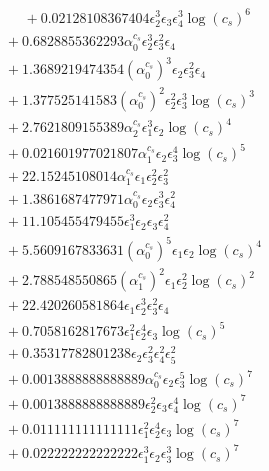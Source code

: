 \documentclass[10pt]{article}
\begin{document}
\begin{align*}
\phantom{F_{s,7}} &\phantom{={}}{}  + 0.02128108367404 \epsilon_{2}^{3} \epsilon_{3} \epsilon_{4}^{3} \log{\left(c_{s} \right)}^{6} \\
&{}  + 0.6828855362293 \alpha_{0}^{c_s} \epsilon_{2}^{3} \epsilon_{3}^{2} \epsilon_{4} \\
&{}  + 1.3689219474354 \left(\alpha_{0}^{c_s}\right)^{3} \epsilon_{2} \epsilon_{3}^{2} \epsilon_{4} \\
&{}  + 1.377525141583 \left(\alpha_{0}^{c_s}\right)^{2} \epsilon_{2}^{2} \epsilon_{3}^{3} \log{\left(c_{s} \right)}^{3} \\
&{}  + 2.7621809155389 \alpha_{2}^{c_s} \epsilon_{1}^{3} \epsilon_{2} \log{\left(c_{s} \right)}^{4} \\
&{}  + 0.021601977021807 \alpha_{1}^{c_s} \epsilon_{2} \epsilon_{3}^{4} \log{\left(c_{s} \right)}^{5} \\
&{}  + 22.15245108014 \alpha_{1}^{c_s} \epsilon_{1} \epsilon_{2}^{2} \epsilon_{3}^{2} \\
&{}  + 1.3861687477971 \alpha_{0}^{c_s} \epsilon_{2} \epsilon_{3}^{3} \epsilon_{4}^{2} \\
&{}  + 11.105455479455 \epsilon_{1}^{3} \epsilon_{2} \epsilon_{3} \epsilon_{4}^{2} \\
&{}  + 5.5609167833631 \left(\alpha_{0}^{c_s}\right)^{5} \epsilon_{1} \epsilon_{2} \log{\left(c_{s} \right)}^{4} \\
&{}  + 2.788548550865 \left(\alpha_{1}^{c_s}\right)^{2} \epsilon_{1} \epsilon_{2}^{2} \log{\left(c_{s} \right)}^{2} \\
&{}  + 22.420260581864 \epsilon_{1} \epsilon_{2}^{3} \epsilon_{3}^{2} \epsilon_{4} \\
&{}  + 0.7058162817673 \epsilon_{1}^{2} \epsilon_{2}^{4} \epsilon_{3} \log{\left(c_{s} \right)}^{5} \\
&{}  + 0.35317782801238 \epsilon_{2} \epsilon_{3}^{2} \epsilon_{4}^{2} \epsilon_{5}^{2} \\
&{}  + 0.0013888888888889 \alpha_{0}^{c_s} \epsilon_{2} \epsilon_{3}^{5} \log{\left(c_{s} \right)}^{7} \\
&{}  + 0.0013888888888889 \epsilon_{2}^{2} \epsilon_{3} \epsilon_{4}^{4} \log{\left(c_{s} \right)}^{7} \\
&{}  + 0.011111111111111 \epsilon_{1}^{2} \epsilon_{2}^{4} \epsilon_{3} \log{\left(c_{s} \right)}^{7} \\
&{}  + 0.022222222222222 \epsilon_{1}^{3} \epsilon_{2} \epsilon_{3}^{3} \log{\left(c_{s} \right)}^{7} \\

\end{align*}
\end{document}

